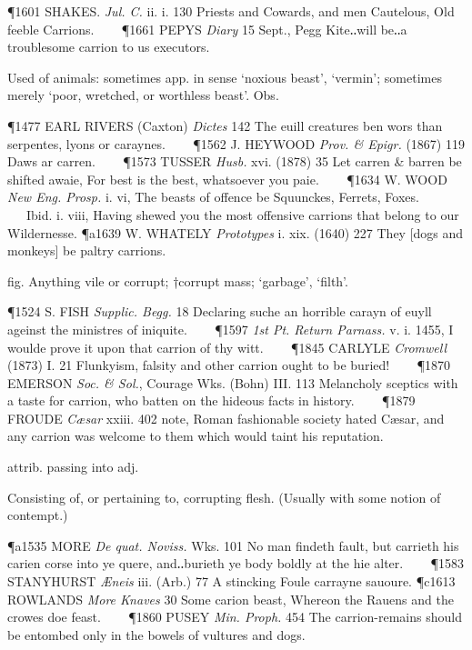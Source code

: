 \begin{description}[wide, labelwidth=!, labelindent=0pt]
\begin{myenumerate}
\P 1601 SHAKES.  \textit{Jul. C.} ii. i. 130 Priests and Cowards, and men Cautelous, Old feeble Carrions.    
\P 1661 PEPYS  \textit{Diary} 15 Sept., Pegg Kite‥will be‥a troublesome carrion to us executors.

 Used of animals: sometimes app. in sense ‘noxious beast’, ‘vermin’; sometimes merely ‘poor, wretched, or worthless beast’. Obs.

\P 1477 EARL RIVERS  (Caxton) \textit{Dictes} 142 The euill creatures ben wors than serpentes, lyons or caraynes.    
\P 1562 J. HEYWOOD  \textit{Prov. \& Epigr.} (1867) 119 Daws ar carren.    
\P 1573 TUSSER  \textit{Husb.} xvi. (1878) 35 Let carren \& barren be shifted awaie, For best is the best, whatsoever you paie.    
\P 1634 W. WOOD  \textit{New Eng. Prosp.} i. vi, The beasts of offence be Squunckes, Ferrets, Foxes.    Ibid. i. viii, Having shewed you the most offensive carrions that belong to our Wildernesse.
\P a1639 W. WHATELY  \textit{Prototypes} i. xix. (1640) 227 They [dogs and monkeys] be paltry carrions.

 fig. Anything vile or corrupt; †corrupt mass; ‘garbage’, ‘filth’.

\P 1524 S. FISH  \textit{Supplic. Begg.} 18 Declaring suche an horrible carayn of euyll ageinst the ministres of iniquite.    
\P 1597 \textit{1st Pt. Return Parnass.} v. i. 1455, I woulde prove it upon that carrion of thy witt.    
\P 1845 CARLYLE  \textit{Cromwell} (1873) I. 21 Flunkyism, falsity and other carrion ought to be buried!    
\P 1870 EMERSON  \textit{Soc. \& Sol.}, Courage Wks. (Bohn) III. 113 Melancholy sceptics with a taste for carrion, who batten on the hideous facts in history.    
\P 1879 FROUDE  \textit{Cæsar} xxiii. 402 note, Roman fashionable society hated Cæsar, and any carrion was welcome to them which would taint his reputation.

 attrib. passing into adj.

 Consisting of, or pertaining to, corrupting flesh. (Usually with some notion of contempt.)

\P a1535 MORE  \textit{De quat. Noviss.} Wks. 101 No man findeth fault, but carrieth his carien corse into ye quere, and‥burieth ye body boldly at the hie alter.    
\P 1583 STANYHURST  \textit{Æneis} iii. (Arb.) 77 A stincking Foule carrayne sauoure.
\P c1613 ROWLANDS  \textit{More Knaves} 30 Some carion beast, Whereon the Rauens and the crowes doe feast.    
\P 1860 PUSEY  \textit{Min. Proph.} 454 The carrion-remains should be entombed only in the bowels of vultures and dogs.


\end{myenumerate}
\end{description}
